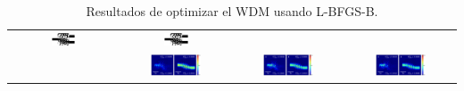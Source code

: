 \begin{landscape}
\begin{table}[ht]
\begin{tabular}{|c|c|c|c|}
      \includegraphics[width=0.24\textwidth]{image/results/wdm/L-BFGS-B/visualize_eps_disc_512.png} &
      \includegraphics[width=0.24\textwidth]{image/results/wdm/L-BFGS-B/visualize_eps_fab_512.png} \\
      \cline{2-4}
      &
      \includegraphics[width=0.50\textwidth]{image/results/wdm/L-BFGS-B/visualize_field_cont_512.png} &
      \includegraphics[width=0.50\textwidth]{image/results/wdm/L-BFGS-B/visualize_field_disc_512.png} &
      \includegraphics[width=0.50\textwidth]{image/results/wdm/L-BFGS-B/visualize_field_fab_512.png} \\
    \hline
    \end{tabular}
    \hspace*{-5cm}
    \caption{Resultados de optimizar el WDM usando L-BFGS-B.}
    \label{tab:opt-LBFGSB-wdm}
\end{table}
\end{landscape}

